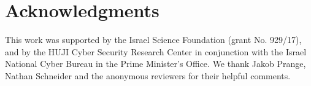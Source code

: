 \documentclass[11pt,a4paper,table]{article}
\begin{document}


\section*{Acknowledgments}

This work was supported by the Israel Science Foundation (grant No. 929/17),
and by the HUJI Cyber Security Research Center
in conjunction with the Israel National Cyber Bureau in the Prime Minister's Office.
We thank Jakob Prange, Nathan Schneider
and the anonymous reviewers for their helpful comments.




\end{document}
